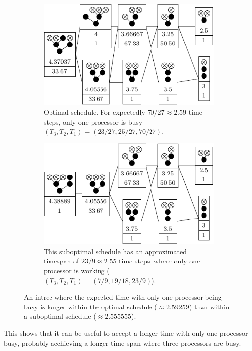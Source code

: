 \begin{figure}[ht]
  \centering
  \begin{subfigure}{.45\linewidth}
    \centering
    \includegraphics{p3/keep_1_unbusy/one_unbusy_opt.pdf}
    \caption{Optimal schedule. For expectedly $70/27\approx 2.59$ time steps, only one processor is busy $(T_3, T_2, T_1)=(23/27, 25/27, 70/27)$.}
  \end{subfigure}
  \quad
  \begin{subfigure}{.45\linewidth}
    \centering
    \includegraphics{p3/keep_1_unbusy/one_unbusy_subopt.pdf}
    \caption{This suboptimal schedule has an approximated timespan of $23/9\approx 2.55$ time steps, where only one processor is working ($(T_3, T_2, T_1)=(7/9,19/18,23/9)$).}
  \end{subfigure}
  \caption{An intree where the expected time with only one processor being busy is longer within the optimal schedule ($\approx 2.59259$) than within a suboptimal schedule ($\approx 2.555555$).}
  \label{fig:p3-p1s-suboptimal-example}
\end{figure}

This shows that it can be useful to accept a longer time with only one processor busy, probably acchieving a longer time span where three processors are busy.

